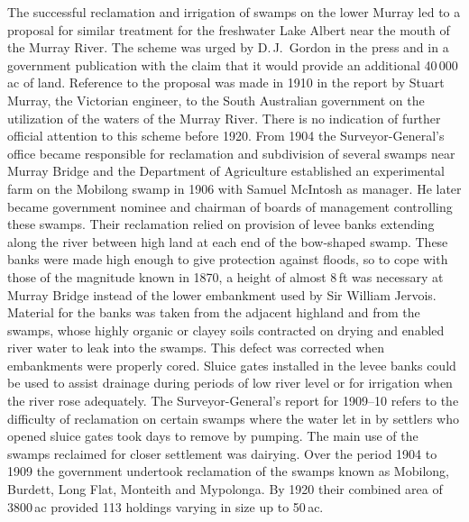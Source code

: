 The successful reclamation and irrigation of swamps on the lower
Murray led to a proposal for similar treatment for the freshwater Lake
Albert near the mouth of the Murray River.  The scheme was urged by
D.\,J.~Gordon in the press and in a government publication with the
claim that it would provide an additional 40\,000\,ac of
land.
Reference to the proposal was made in 1910 in the report by Stuart
Murray, the Victorian engineer, to the South Australian government on
the utilization of the waters of the Murray River.  There is no indication of further official
attention to this scheme before 1920.  From 1904 the
Surveyor-General's office became responsible for reclamation and
subdivision of several swamps near Murray Bridge and the Department of
Agriculture established an experimental farm on the Mobilong swamp in
1906 with Samuel McIntosh as manager.  He later became government
nominee and chairman of boards of management controlling these swamps.
Their reclamation relied on provision of levee banks extending along
the river between high land at each end of the bow-shaped swamp.
These banks were made high enough to give protection against floods,
so to cope with those of the magnitude known in 1870, a height of
almost 8\,ft was necessary at Murray Bridge instead of the lower
embankment used by Sir William Jervois.  Material for the banks
was taken from the adjacent highland and from the swamps, whose highly
organic or clayey soils contracted on drying and enabled river water
to leak into the swamps.  This defect was corrected when embankments
were properly cored.  Sluice gates installed in the levee banks could
be used to assist drainage during periods of low river level or for
irrigation when the river rose adequately. The Surveyor-General's
report for 1909--10 refers to the difficulty of reclamation on certain
swamps where the water let in by settlers who opened sluice gates took
days to remove by pumping.  The main use of the swamps reclaimed for
closer settlement was dairying.  Over the period 1904 to 1909 the
government undertook reclamation of the swamps known as Mobilong,
Burdett, Long Flat, Monteith and Mypolonga.  By 1920 their combined
area of 3800\,ac provided 113 holdings varying in size up to 50\,ac.

